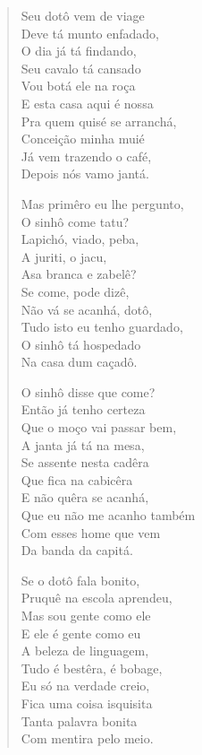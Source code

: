 \begin{verse}
Seu dotô vem de viage\\
Deve tá munto enfadado,\\
O dia já tá findando,\\
Seu cavalo tá cansado\\
Vou botá ele na roça\\
E esta casa aqui é nossa\\
Pra quem quisé se arranchá,\\
Conceição minha muié\\
Já vem trazendo o café,\\
Depois nós vamo jantá.

Mas primêro eu lhe pergunto,\\
O sinhô come tatu?\\
Lapichó, viado, peba,\\
A juriti, o jacu,\\
Asa branca e zabelê?\\
Se come, pode dizê,\\
Não vá se acanhá, dotô,\\
Tudo isto eu tenho guardado,\\
O sinhô tá hospedado\\
Na casa dum caçadô.

O sinhô disse que come?\\
Então já tenho certeza\\
Que o moço vai passar bem,\\
A janta já tá na mesa,\\
Se assente nesta cadêra\\
Que fica na cabicêra\\
E não quêra se acanhá,\\
Que eu não me acanho também\\
Com esses home que vem\\
Da banda da capitá.

Se o dotô fala bonito,\\
Pruquê na escola aprendeu,\\
Mas sou gente como ele\\
E ele é gente como eu\\
A beleza de linguagem,\\
Tudo é bestêra, é bobage,\\
Eu só na verdade creio,\\
Fica uma coisa isquisita\\
Tanta palavra bonita\\
Com mentira pelo meio.


\end{verse}
